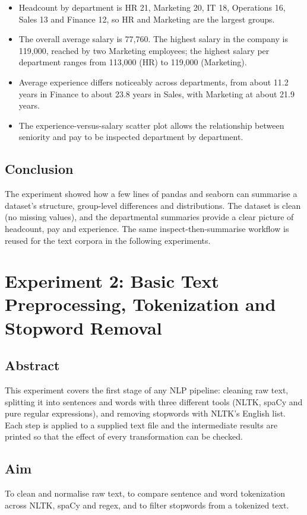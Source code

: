 \documentclass[12pt,a4paper,oneside]{report}
\providecommand{\tightlist}{\setlength{\itemsep}{0pt}\setlength{\parskip}{0pt}}
\begin{document}
\begin{itemize}
\tightlist
\item
  Headcount by department is HR 21, Marketing 20, IT 18, Operations 16, Sales 13 and Finance 12, so HR and Marketing are the largest groups.
\item
  The overall average salary is 77,760. The highest salary in the company is 119,000, reached by two Marketing employees; the highest salary per department ranges from 113,000 (HR) to 119,000 (Marketing).
\item
  Average experience differs noticeably across departments, from about 11.2 years in Finance to about 23.8 years in Sales, with Marketing at about 21.9 years.
\item
  The experience-versus-salary scatter plot allows the relationship between seniority and pay to be inspected department by department.
\end{itemize}


\section{Conclusion}
The experiment showed how a few lines of pandas and seaborn can summarise a dataset's structure, group-level differences and distributions. The dataset is clean (no missing values), and the departmental summaries provide a clear picture of headcount, pay and experience. The same inspect-then-summarise workflow is reused for the text corpora in the following experiments.


\chapter{Experiment 2: Basic Text Preprocessing, Tokenization and Stopword Removal}
\section{Abstract}
This experiment covers the first stage of any NLP pipeline: cleaning raw text, splitting it into sentences and words with three different tools (NLTK, spaCy and pure regular expressions), and removing stopwords with NLTK's English list. Each step is applied to a supplied text file and the intermediate results are printed so that the effect of every transformation can be checked.


\section{Aim}
To clean and normalise raw text, to compare sentence and word tokenization across NLTK, spaCy and regex, and to filter stopwords from a tokenized text.
\end{document}
